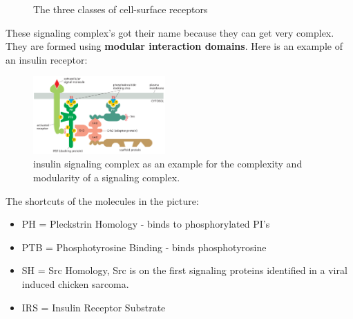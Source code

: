 \documentclass[../main.tex]{subfiles}
\begin{document}
\begin{figure}[H]
	\centering
	\hfill
	\hfill
	\caption{The three classes of cell-surface receptors}
\end{figure}

These signaling complex's got their name because they can get very complex. They are formed using \textbf{modular interaction domains}. Here is an example of an insulin receptor:

\begin{figure}[H]
	\centering
	\includegraphics[width=0.45\textwidth]{start_ins}
	\caption{insulin signaling complex as an example for the complexity and modularity of a signaling complex.}
\end{figure}
The shortcuts of the molecules in the picture:
\begin{itemize}
	\item PH = Pleckstrin Homology - binds to phosphorylated PI's
	\item PTB = Phosphotyrosine Binding - binds phosphotyrosine
	\item SH = Src Homology, Src is on the first signaling proteins identified in a viral induced chicken sarcoma.
	\item IRS = Insulin Receptor Substrate
\end{itemize}
\end{document}
